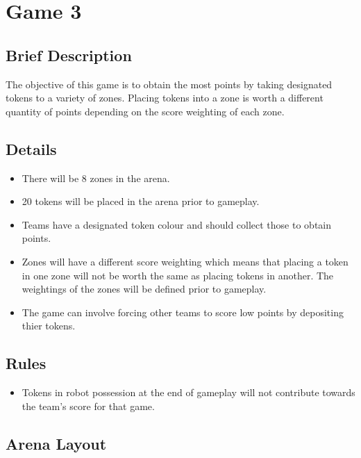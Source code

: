 \section {Game 3}

\subsection {Brief Description}

The objective of this game is to obtain the most points by taking designated tokens to a variety of zones. Placing tokens into a zone is worth a different quantity of points depending on the score weighting of each zone.

\subsection {Details}

\begin {itemize}

\item There will be 8 zones in the arena.
\item 20 tokens will be placed in the arena prior to gameplay.
\item Teams have a designated token colour and should collect those to obtain points.
\item Zones will have a different score weighting which means that placing a token in one zone will not be worth the same as placing tokens in another. The weightings of the zones will be defined prior to gameplay.
\item The game can involve forcing other teams to score low points by depositing thier tokens. 

\end {itemize}

\subsection {Rules}

\begin {itemize}

\item Tokens in robot possession at the end of gameplay will not contribute towards the team's score for that game.

\end {itemize}

\clearpage
\newpage

\subsection {Arena Layout}

